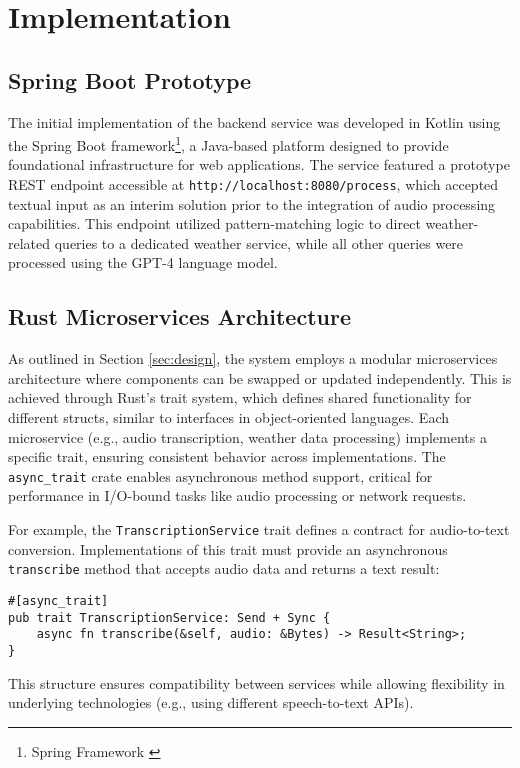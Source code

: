 \renewcommand*\chapterpagestyle{scrheadings}
\chapter{Implementation}

\section{Spring Boot Prototype}
The initial implementation of the backend service was developed in Kotlin using the Spring Boot framework\footnote{Spring Framework \cite{spring}}, a Java-based platform designed to provide foundational infrastructure for web applications. The service featured a prototype REST endpoint accessible at \texttt{http://localhost:8080/process}, which accepted textual input as an interim solution prior to the integration of audio processing capabilities. This endpoint utilized pattern-matching logic to direct weather-related queries to a dedicated weather service, while all other queries were processed using the GPT-4 language model.

\section{Rust Microservices Architecture}
As outlined in Section \ref{sec:design}, the system employs a modular microservices architecture where components can be swapped or updated independently.
This is achieved through Rust's trait system, which defines shared functionality for different structs, similar to interfaces in object-oriented languages.
Each microservice (e.g., audio transcription, weather data processing) implements a specific trait, ensuring consistent behavior across implementations.
The \texttt{async\_trait} crate enables asynchronous method support, critical for performance in I/O-bound tasks like audio processing or network requests.

For example, the \texttt{TranscriptionService} trait defines a contract for audio-to-text conversion.
Implementations of this trait must provide an asynchronous \texttt{transcribe} method that accepts audio data and returns a text result:
\begin{verbatim}
#[async_trait]
pub trait TranscriptionService: Send + Sync {
    async fn transcribe(&self, audio: &Bytes) -> Result<String>;
}
\end{verbatim}
This structure ensures compatibility between services while allowing flexibility in underlying technologies (e.g., using different speech-to-text APIs).